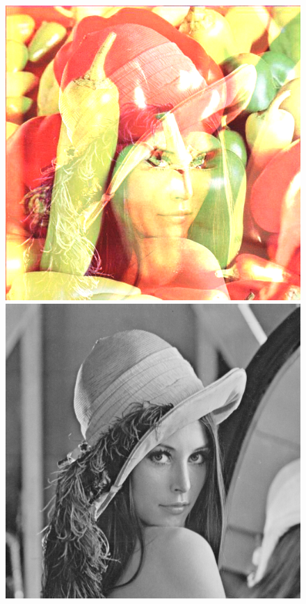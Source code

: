\documentclass{article}
\begin{document}
\begin{figure}[!htb]
\includegraphics[scale=0.2]{img/_Sumowanie_Obrazka__lena_24bit_peppers_24bit.png}\\
\includegraphics[scale=0.2]{img/lena_8bit.png} 

\end{figure}
\end{document}
